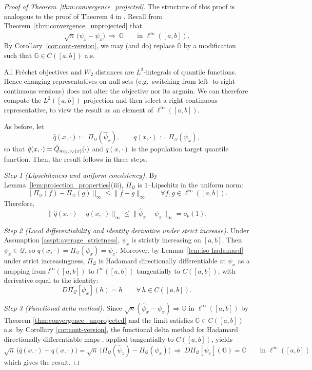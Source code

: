 \documentclass[12pt]{article}
\newcommand{\est}{\ensuremath{\textnormal{D-IV}}\xspace}
\begin{document}
\begin{proof}[Proof of Theorem~\ref{thm:convergence_projected}]
The structure of this proof is analogous to the proof of Theorem 4 in \citet{van2025regression}. Recall from Theorem~\ref{thm:convergence_unprojected} that
\[
\sqrt{n}\,\big(\hat\psi_x-\psi_x\big)\ \Rightarrow\ \mathbb{G}
\qquad\text{in }\ell^\infty([a,b]).
\]
By Corollary~\ref{cor:cont-version}, we may (and do) replace $\mathbb G$ by a modification such that
$\mathbb G\in C([a,b])$ a.s.


All Fr\'echet objectives and $W_2$ distances are $L^2$-integrals of quantile functions. Hence changing
representatives on null sets (e.g.\ switching from left- to right-continuous versions) does not alter the
objective nor its argmin. We can therefore compute the $L^2([a,b])$ projection and then select a
right-continuous representative, to view the result as an element of $\ell^\infty([a,b])$.

As before, let
\[
\hat q(x,\cdot):=\Pi_{\mathcal Q}(\hat\psi_x),
\qquad
q(x,\cdot):=\Pi_{\mathcal Q}(\psi_x),
\]
so that $\hat q(x,\cdot)=\hat Q_{m_{\est}(x)}(\cdot)$ and $q(x,\cdot)$ is the population
target quantile function. Then, the result follows in three steps. 

\smallskip
\noindent\textit{Step 1 (Lipschitzness and uniform consistency).}
By Lemma~\ref{lem:projection_properties}(iii), $\Pi_{\mathcal Q}$ is $1$--Lipschitz in the uniform norm:
\[
\|\Pi_{\mathcal Q}(f)-\Pi_{\mathcal Q}(g)\|_\infty
\le \|f-g\|_\infty
\qquad\forall f,g\in\ell^\infty([a,b]).
\]
Therefore,
\[
\|\hat q(x,\cdot)-q(x,\cdot)\|_\infty
\le \|\hat\psi_x-\psi_x\|_\infty
=o_p(1).
\]

\smallskip
\noindent\textit{Step 2 (Local differentiability and identity derivative under strict increase).}
Under Assumption \ref{asspt:average_strictness}, $\psi_x$ is strictly increasing on $[a,b]$.
Then $\psi_x\in\mathcal Q$, so $q(x,\cdot)=\Pi_{\mathcal Q}(\psi_x)=\psi_x$.
Moreover, by Lemma~\ref{lem:iso-hadamard} under strict increasingness, $\Pi_{\mathcal Q}$ is Hadamard
directionally differentiable at $\psi_x$ as a mapping from $l^\infty([a,b])$ to $l^\infty([a,b])$ tangentially to $C([a,b])$, with derivative equal to the identity:
\[
D\Pi_{\mathcal Q}[\psi_x](h)=h
\qquad\forall\,h\in C([a,b]).
\]

\smallskip
\noindent\textit{Step 3 (Functional delta method).}
Since $\sqrt n(\hat\psi_x-\psi_x)\Rightarrow \mathbb G$ in $\ell^\infty([a,b])$ by Theorem \ref{thm:convergence_unprojected} and the limit satisfies
$\mathbb G\in C([a,b])$ a.s. by Corollary \ref{cor:cont-version}, the functional delta method for Hadamard directionally differentiable maps
\citep[Thm.~20.8]{van2000asymptotic}, applied tangentially to $C([a,b])$, yields
\[
\sqrt{n}\,\big(\hat q(x,\cdot)-q(x,\cdot)\big)
=
\sqrt{n}\,\Big(\Pi_{\mathcal Q}(\hat\psi_x)-\Pi_{\mathcal Q}(\psi_x)\Big)
\ \Rightarrow\
D\Pi_{\mathcal Q}[\psi_x](\mathbb{G})
=
\mathbb{G}
\qquad\text{in }\ell^\infty([a,b])
\]
which gives the result.
\end{proof}
\end{document}
